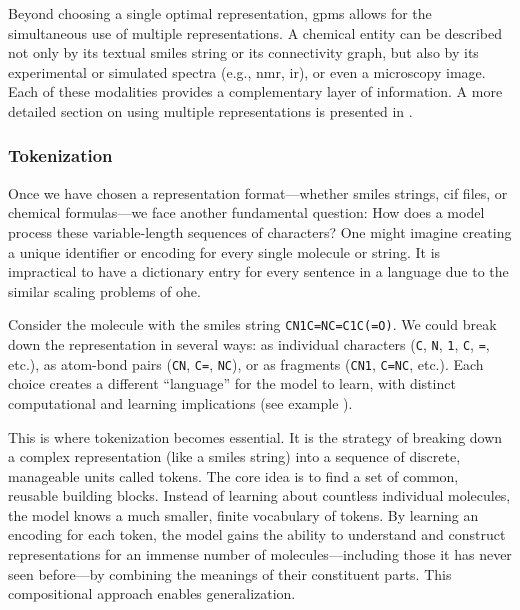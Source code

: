 Beyond choosing a single optimal representation, \glspl{gpm} allows for the simultaneous use of multiple representations. 
A chemical entity can be described not only by its textual \gls{smiles} string or its connectivity graph, but also by its experimental or simulated spectra (e.g., \gls{nmr}, \gls{ir}), or even a microscopy image. 
Each of these modalities provides a complementary layer of information. 
A more detailed section on using multiple representations is presented in .


\subsubsection{Tokenization}
Once we have chosen a representation format---whether \gls{smiles} strings, \gls{cif} files, or chemical formulas---we face another fundamental question: How does a model process these variable-length sequences of characters? 
One might imagine creating a unique identifier or encoding for every single molecule or string. 
It is impractical to have a dictionary entry for every sentence in a language due to the similar scaling problems of \gls{ohe}.

Consider the molecule with the \gls{smiles} string \texttt{CN1C=NC=C1C(=O)}. 
We could break down the representation in several ways: as individual characters (\texttt{C}, \texttt{N}, \texttt{1}, \texttt{C}, \texttt{=}, etc.), as atom-bond pairs (\texttt{CN}, \texttt{C=}, \texttt{NC}), or as fragments (\texttt{CN1}, \texttt{C=NC}, etc.). 
Each choice creates a different \enquote{language} for the model to learn, with distinct computational and learning implications (see example ).

This is where tokenization becomes essential. 
It is the strategy of breaking down a complex representation (like a \gls{smiles} string) into a sequence of discrete, manageable units called tokens. 
The core idea is to find a set of common, reusable building blocks. Instead of learning about countless individual molecules, the model knows a much smaller, finite vocabulary of tokens. By learning an encoding for each token, the model gains the ability to understand and construct representations for an immense number of molecules---including those it has never seen before---by combining the meanings of their constituent parts. 
This compositional approach enables generalization.


